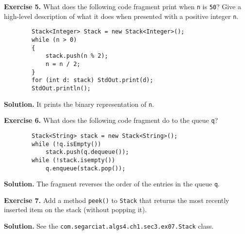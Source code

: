 \documentclass[12pt, a4paper]{article}
\newenvironment{ex}[2][Exercise]
{\par\medskip\noindent \textbf{#1 #2.}}
{\medskip}
\newenvironment{sol}[1][Solution]
{\par\medskip\noindent \textbf{#1.} }
{\medskip}
\begin{document}
	\begin{ex}{5}
		What does the following code fragment print when \texttt{n} is \texttt{50}?
		Give a high-level description of what it does when presented with a positive
		integer \texttt{n}.
		
		\begin{lstlisting}
		Stack<Integer> Stack = new Stack<Integer>();
		while (n > 0)
		{
			stack.push(n % 2);
			n = n / 2;
		}
		for (int d: stack) StdOut.print(d);
		StdOut.println();
		\end{lstlisting}
	\end{ex}
	\begin{sol}
		It prints the binary representation of \texttt{n}.
	\end{sol}

	\begin{ex}{6}
		What does the following code fragment do to the queue \texttt{q}?
		\begin{lstlisting}
		Stack<String> stack = new Stack<String>();
		while (!q.isEmpty())
			stack.push(q.dequeue());
		while (!stack.isempty())
			q.enqueue(stack.pop());
		\end{lstlisting}
	\end{ex}
	\begin{sol}
		The fragment reverses the order of the entries in the queue \texttt{q}.
	\end{sol}
	\begin{ex}{7}
		Add a method \texttt{peek()} to \texttt{Stack} that returns the most recently inserted
		item on the stack (without popping it).
	\end{ex}
	\begin{sol}
		See the \texttt{com.segarciat.algs4.ch1.sec3.ex07.Stack} class.
	\end{sol}
	\pagebreak
	\printbibliography
\end{document}

